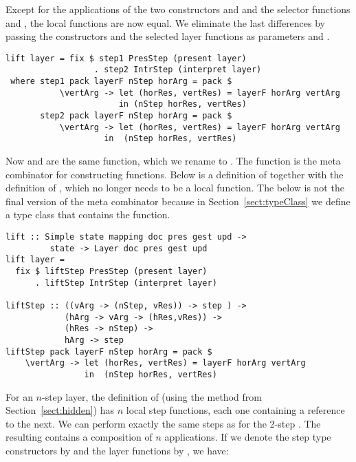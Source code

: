 \documentclass[preprint,natbib]{sigplanconf}
\begin{document}
Except for the applications of the two constructors  and  and the selector functions  and , the local functions are now equal. We eliminate the last differences by passing the constructors and the selected layer functions as parameters  and .

\begin{small} %
\begin{verbatim}
lift layer = fix $ step1 PresStep (present layer) 
                  . step2 IntrStep (interpret layer) 
 where step1 pack layerF nStep horArg = pack $ 
           \vertArg -> let (horRes, vertRes) = layerF horArg vertArg                                         
                       in (nStep horRes, vertRes)
       step2 pack layerF nStep horArg = pack $
           \vertArg -> let (horRes, vertRes) = layerF horArg vertArg                     
                    in  (nStep horRes, vertRes)
\end{verbatim}
\end{small}

Now  and  are the same function, which we rename to .  The function  is the meta combinator for constructing  functions. Below is a definition of  together with the definition of , which no longer needs to be a local function. The  below is not the final version of the meta combinator because in Section~\ref{sect:typeClass} we define a type class that contains the  function.


\begin{small} %
\begin{verbatim}
lift :: Simple state mapping doc pres gest upd ->
         state -> Layer doc pres gest upd
lift layer = 
  fix $ liftStep PresStep (present layer) 
      . liftStep IntrStep (interpret layer)

liftStep :: ((vArg -> (nStep, vRes)) -> step ) ->
            (hArg -> vArg -> (hRes,vRes)) ->
            (hRes -> nStep) ->
            hArg -> step
liftStep pack layerF nStep horArg = pack $
    \vertArg -> let (horRes, vertRes) = layerF horArg vertArg                     
                in  (nStep horRes, vertRes)
\end{verbatim}
\end{small}



For an $n$-step layer, the definition of  (using the method from Section~\ref{sect:hidden}) has $n$ local step functions, each one containing a reference to the next. \bc {} \ec We can perform exactly the same steps as for the 2-step . The resulting  contains a composition of $n$  applications. If we denote the step type constructors by  and the layer functions by , we have:
\end{document}
